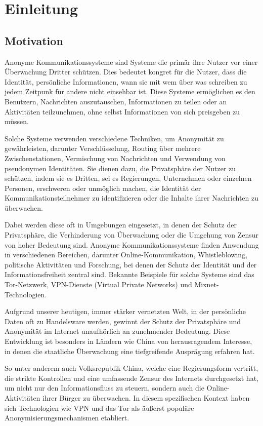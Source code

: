 \section{Einleitung}

\subsection{Motivation}

Anonyme Kommunikationssysteme sind Systeme die primär ihre Nutzer vor einer Überwachung Dritter schützen. Dies bedeutet kongret für die Nutzer, dass die Identität, persönliche Informationen, wann sie mit wem über was schreiben zu jedem Zeitpunk für andere nicht einsehbar ist. Diese Systeme ermöglichen es den Benutzern, Nachrichten auszutauschen, Informationen zu teilen oder an Aktivitäten teilzunehmen, ohne selbst Informationen von sich preisgeben zu müssen.

Solche Systeme verwenden verschiedene Techniken, um Anonymität zu gewährleisten, darunter Verschlüsselung, Routing über mehrere Zwischenstationen, Vermischung von Nachrichten und Verwendung von pseudonymen Identitäten. Sie dienen dazu, die Privatsphäre der Nutzer zu schützen, indem sie es Dritten, sei es Regierungen, Unternehmen oder einzelnen Personen, erschweren oder unmöglich machen, die Identität der Kommunikationsteilnehmer zu identifizieren oder die Inhalte ihrer Nachrichten zu überwachen.

Dabei werden diese oft in Umgebungen eingesetzt, in denen der Schutz der Privatsphäre, die Verhinderung von Überwachung oder die Umgehung von Zensur von hoher Bedeutung sind. Anonyme Kommunikationssysteme finden Anwendung in verschiedenen Bereichen, darunter Online-Kommunikation, Whistleblowing, politische Aktivitäten und Forschung, bei denen der Schutz der Identität und der Informationsfreiheit zentral sind. Bekannte Beispiele für solche Systeme sind das Tor-Netzwerk, VPN-Dienste (Virtual Private Networks) und Mixnet-Technologien.

Aufgrund unserer heutigen, immer stärker vernetzten Welt, in der persönliche Daten oft zu Handelsware werden, gewinnt der Schutz der Privatsphäre und Anonymität im Internet unaufhörlich an zunehmender Bedeutung. Diese Entwicklung ist besonders in Ländern wie China von herausragendem Interesse, in denen die staatliche Überwachung eine tiefgreifende Ausprägung erfahren hat.

So unter anderem auch Volksrepublik China, welche eine Regierungsform vertritt, die strikte Kontrollen und eine umfassende Zensur des Internets durchgesetzt hat, um nicht nur den Informationsfluss zu steuern, sondern auch die Online-Aktivitäten ihrer Bürger zu überwachen. In diesem spezifischen Kontext haben sich Technologien wie VPN und das Tor als äußerst populäre Anonymisierungsmechanismen etabliert.

